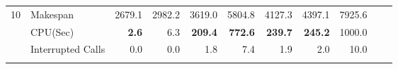 \documentclass[runningheads]{llncs}
\begin{document}
\begin{table}[t]
\begin{tabular}{l l r r r r r r r r r}
    10               & Makespan             & 2679.1	& 2982.2   & 3619.0	     & 5804.8	   & 4127.3	 & 4397.1  & 7925.6 \\
                     & CPU(Sec)             & \textbf{2.6}	    & 6.3	   & \textbf{209.4}	     & \textbf{772.6}	   & \textbf{239.7}	 & \textbf{245.2}   & 1000.0 \\
                     & Interrupted Calls    & 0.0	    & 0.0      & 1.8	     & 7.4	       & 1.9	 & 2.0     & 10.0 \\
    \\[-2.75mm]
    \hline
    \end{tabular}
\end{table}




\end{document}
